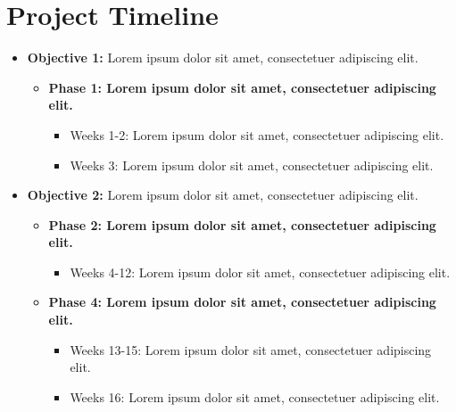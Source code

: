 \section{Project Timeline}

\lipsum[8]

\begin{itemize}
    \item \textbf{Objective 1:} Lorem ipsum dolor sit amet, consectetuer adipiscing elit.

    \begin{itemize}
        \item \textbf{Phase 1: Lorem ipsum dolor sit amet, consectetuer adipiscing elit.}

        \begin{itemize}
            \item Weeks 1-2: Lorem ipsum dolor sit amet, consectetuer adipiscing elit.
            \item Weeks 3: Lorem ipsum dolor sit amet, consectetuer adipiscing elit.
        \end{itemize}
    \end{itemize}

    \item \textbf{Objective 2:} Lorem ipsum dolor sit amet, consectetuer adipiscing elit. 

    \begin{itemize}
        \item \textbf{Phase 2: Lorem ipsum dolor sit amet, consectetuer adipiscing elit.}

        \begin{itemize}
            \item Weeks 4-12: Lorem ipsum dolor sit amet, consectetuer adipiscing elit. 
        \end{itemize}
    \end{itemize}

    \begin{itemize}
        \item \textbf{Phase 4: Lorem ipsum dolor sit amet, consectetuer adipiscing elit.}

        \begin{itemize}
            \item Weeks 13-15: Lorem ipsum dolor sit amet, consectetuer adipiscing elit.
            \item Weeks 16: Lorem ipsum dolor sit amet, consectetuer adipiscing elit.
        \end{itemize}
    \end{itemize}


\end{itemize}
